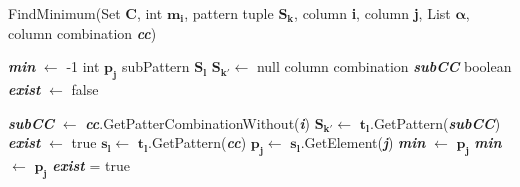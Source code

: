 \begin{algorithm}
	\caption{FindMinimum(Set \textbf{C}, int $\pmb{m_{i}}$, pattern tuple  $\pmb{S_{k}}$, column \textbf{i}, column \textbf{j}, List $\pmb{\alpha}$, column combination \textbf{\textit{cc}})}\label{FindMinimum}
	\begin{algorithmic}[1]
	\State \textbf{\textit{min}} $\gets$ -1
	\State int $\pmb{p_{j}}$
	\State subPattern $\pmb{S_{l}}$
	\State $\pmb{S_{k'}} \gets$ null
	\State column combination \textbf{\textit{subCC}}
	\State boolean \textbf{\textit{exist }} $\gets$ false
	
	\State \textbf{\textit{subCC}} $\gets$ \textbf{\textit{cc}}.GetPatterCombinationWithout(\textbf{\textit{i}})
	\State  $\pmb{S_{k'}} \gets$ $\pmb{t_{l}}$.GetPattern(\textbf{\textit{subCC}})
			\State \textbf{\textit{exist }} $\gets$ true
		\EndIf
				\State $\pmb{s_{l}} \gets$ $\pmb{t_{l}}$.GetPattern(\textbf{\textit{cc}})
				\State $\pmb{p_{j}} \gets$ $\pmb{s_{l}}$.GetElement(\textbf{\textit{j}})
					\State \textbf{\textit{min}} $\gets$ $\pmb{p_{j}}$
						\State \textbf{\textit{min}} $\gets$ $\pmb{p_{j}}$
					\EndIf
					\State	\textbf{\textit{exist}} = true
 				\EndIf
			\EndFor
	\end{algorithmic}
\end{algorithm}

